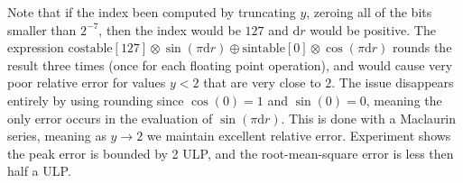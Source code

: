 \documentclass{article}
\theoremstyle{plain}
\begin{document}
        Note that if the index been computed by truncating $y$,
        zeroing all of the bits smaller than $2^{-7}$,
        then the index would be $127$ and $\textrm{d}r$
        would be positive. The expression
        $%
            \textrm{costable}[127]\otimes\sin(\pi\textrm{d}r)%
            \oplus%
            \textrm{sintable}[0]\otimes\cos(\pi\textrm{d}r)%
        $
        rounds the result three times (once for each floating point operation),
        and would cause very poor relative error for values $y<2$ that are very
        close to $2$. The issue disappears entirely by using rounding since
        $\cos(0)=1$ and $\sin(0)=0$, meaning the only error occurs in the
        evaluation of $\sin(\pi\textrm{d}r)$. This is done with a Maclaurin
        series, meaning as $y\rightarrow{2}$ we maintain excellent relative
        error. Experiment shows the peak error is bounded by 2 ULP,
        and the root-mean-square error is less then
        half a ULP.
\end{document}
